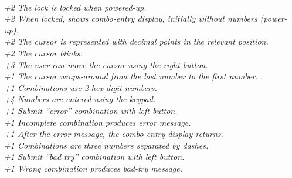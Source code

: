 \begin{enumerate}
 \\
    \textit{+2 The lock is locked when powered-up.} \\
    \textit{+2 When locked, shows combo-entry display, initially without numbers
        (power-up).} \\
    \textit{+2 The cursor is represented with decimal points in the relevant
        position.} \\
    \textit{+2 The cursor blinks.}
 \\
    \textit{+3 The user can move the cursor using the right button.}
 \\
    \textit{+1 The cursor wraps-around from the last number to the first
        number.}
. \\
    \textit{+1 Combinations use 2-hex-digit numbers.} \\
    \textit{+4 Numbers are entered using the keypad.}
 \\
    \textit{+1 Submit ``error'' combination with left button.} \\
    \textit{+1 Incomplete combination produces error message.} \\
    \textit{+1 After the error message, the combo-entry display returns.}
 \\
    \textit{+1 Combinations are three numbers separated by dashes.}
 \\
    \textit{+1 Submit ``bad try'' combination with left button.} \\
    \textit{+1 Wrong combination produces bad-try message.} \\

\end{enumerate}
